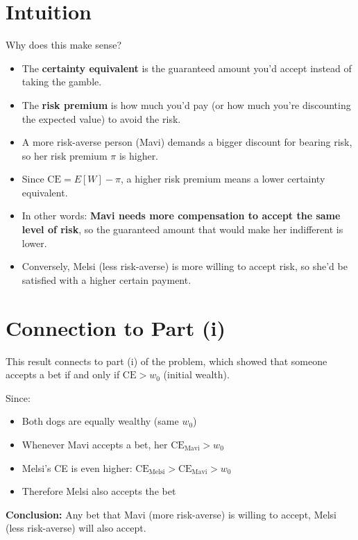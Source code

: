 \documentclass[11pt]{article}
\theoremstyle{definition}
\begin{document}
\section{Intuition}

Why does this make sense?

\begin{itemize}[leftmargin=*]
\item The \textbf{certainty equivalent} is the guaranteed amount you'd accept instead of taking the gamble.

\item The \textbf{risk premium} is how much you'd pay (or how much you're discounting the expected value) to avoid the risk.

\item A more risk-averse person (Mavi) demands a bigger discount for bearing risk, so her risk premium $\pi$ is higher.

\item Since $\text{CE} = E[W] - \pi$, a higher risk premium means a lower certainty equivalent.

\item In other words: \textbf{Mavi needs more compensation to accept the same level of risk}, so the guaranteed amount that would make her indifferent is lower.

\item Conversely, Melsi (less risk-averse) is more willing to accept risk, so she'd be satisfied with a higher certain payment.
\end{itemize}

\section{Connection to Part (i)}

This result connects to part (i) of the problem, which showed that someone accepts a bet if and only if $\text{CE} > w_0$ (initial wealth).

Since:
\begin{itemize}
\item Both dogs are equally wealthy (same $w_0$)
\item Whenever Mavi accepts a bet, her $\text{CE}_{\text{Mavi}} > w_0$
\item Melsi's CE is even higher: $\text{CE}_{\text{Melsi}} > \text{CE}_{\text{Mavi}} > w_0$
\item Therefore Melsi also accepts the bet
\end{itemize}

\textbf{Conclusion:} Any bet that Mavi (more risk-averse) is willing to accept, Melsi (less risk-averse) will also accept.
\end{document}
